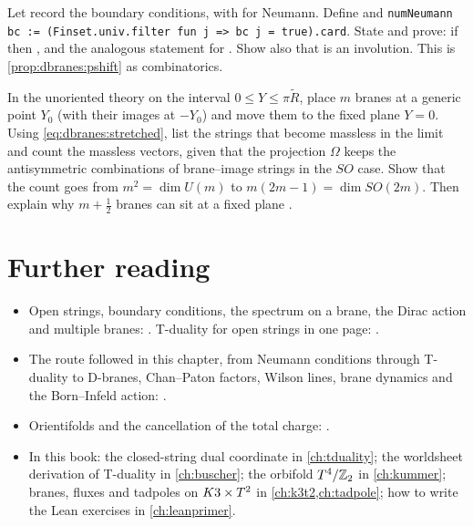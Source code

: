 \begin{exercise}\label{ex:dbranes:leanflip}
Let  record the boundary conditions, with  for Neumann. Define
 and
\texttt{numNeumann bc := (Finset.univ.filter fun j => bc j = true).card}. State and prove: if
 then , and the analogous
statement for . Show also that  is an involution. This is
\cref{prop:dbranes:pshift} as combinatorics.
\end{exercise}

\begin{exercise}[$\star\star\star$]
In the unoriented theory on the interval $0\le Y\le\pi\tilde R$, place $m$ branes at a generic
point $Y_0$ (with their images at $-Y_0$) and move them to the fixed plane $Y=0$. Using
\eqref{eq:dbranes:stretched}, list the strings that become massless in the limit and count the
massless vectors, given that the projection $\Omega$ keeps the antisymmetric combinations of
brane--image strings in the $SO$ case. Show that the count goes from $m^2=\dim U(m)$ to
$m(2m-1)=\dim SO(2m)$. Then explain why $m+\frac12$ branes can sit at a fixed plane
.
\end{exercise}

\section*{Further reading}
\begin{itemize}[leftmargin=*]
\item Open strings, boundary conditions, the spectrum on a brane, the Dirac action and multiple
 branes: . T-duality for open strings in one page:
 .
\item The route followed in this chapter, from Neumann conditions through T-duality to D-branes,
 Chan--Paton factors, Wilson lines, brane dynamics and the Born--Infeld action:
 .
\item Orientifolds and the cancellation of the total charge: .
\item In this book: the closed-string dual coordinate in \cref{ch:tduality}; the worldsheet
 derivation of T-duality in \cref{ch:buscher}; the orbifold $T^4/\mathbb{Z}_2$ in \cref{ch:kummer}; branes,
 fluxes and tadpoles on $K3\times T^2$ in \cref{ch:k3t2,ch:tadpole}; how to write the Lean exercises in
 \cref{ch:leanprimer}.
\end{itemize}
